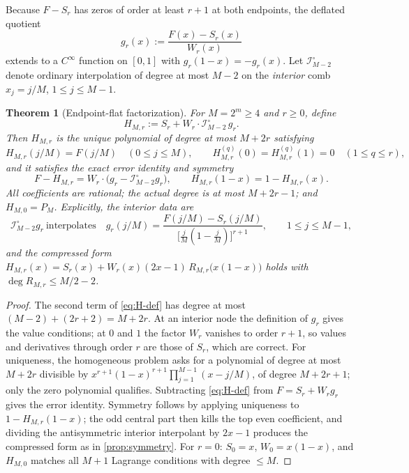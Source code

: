 \documentclass[11pt,oneside]{article}
\numberwithin{equation}{section}
\newtheorem{theorem}{Theorem}[section]
\theoremstyle{definition}
\theoremstyle{remark}
\newcommand{\Lag}{\mathcal I}
\begin{document}
Because $F-S_r$ has zeros of order at least $r+1$ at both endpoints,
the deflated quotient
\begin{equation}
 g_r(x):=\frac{F(x)-S_r(x)}{W_r(x)}
 \label{eq:def-g}
\end{equation}
extends to a $C^\infty$ function on $[0,1]$ with
$g_r(1-x)=-g_r(x)$.  Let $\Lag^{\circ}_{M-2}$ denote ordinary
interpolation of degree at most $M-2$ on the \emph{interior} comb
$x_j=j/M$, $1\le j\le M-1$.

\begin{theorem}[Endpoint-flat factorization]
\label{thm:factorization}
For $M=2^{m}\ge4$ and $r\ge0$, define
\begin{equation}
 H_{M,r}:=S_r+W_r\cdot\Lag^{\circ}_{M-2}\,g_r.
 \label{eq:H-def}
\end{equation}
Then $H_{M,r}$ is the unique polynomial of degree at most $M+2r$
satisfying
\begin{equation}
 H_{M,r}(j/M)=F(j/M)\quad(0\le j\le M),
 \qquad
 H^{(q)}_{M,r}(0)=H^{(q)}_{M,r}(1)=0\quad(1\le q\le r),
 \label{eq:H-conditions}
\end{equation}
and it satisfies the exact error identity and symmetry
\begin{equation}
 F-H_{M,r}=W_r\cdot\bigl(g_r-\Lag^{\circ}_{M-2}g_r\bigr),
 \qquad
 H_{M,r}(1-x)=1-H_{M,r}(x).
 \label{eq:H-error-factor}
\end{equation}
All coefficients are rational; the actual degree is at most
$M+2r-1$; and $H_{M,0}=P_M$.  Explicitly, the interior data are
\begin{equation}
 \Lag^{\circ}_{M-2}g_r\ \text{interpolates}\quad
 g_r(j/M)=\frac{F(j/M)-S_r(j/M)}
 {\bigl[\tfrac jM(1-\tfrac jM)\bigr]^{r+1}},
 \qquad 1\le j\le M-1,
 \label{eq:quotient-data}
\end{equation}
and the compressed form
$H_{M,r}(x)=S_r(x)+W_r(x)(2x-1)\,
R_{M,r}\bigl(x(1-x)\bigr)$ holds with $\deg R_{M,r}\le M/2-2$.
\end{theorem}

\begin{proof}
The second term of \eqref{eq:H-def} has degree at most
$(M-2)+(2r+2)=M+2r$.  At an interior node the definition of
$g_r$ gives the value conditions; at $0$ and $1$ the factor $W_r$
vanishes to order $r+1$, so values and derivatives through order $r$
are those of $S_r$, which are correct.  For uniqueness, the
homogeneous problem asks for a polynomial of degree at most
$M+2r$ divisible by
$x^{r+1}(1-x)^{r+1}\prod_{j=1}^{M-1}(x-j/M)$, of degree
$M+2r+1$; only the zero polynomial qualifies.  Subtracting
\eqref{eq:H-def} from $F=S_r+W_rg_r$ gives the error identity.
Symmetry follows by applying uniqueness to $1-H_{M,r}(1-x)$; the odd
central part then kills the top even coefficient, and dividing the
antisymmetric interior interpolant by $2x-1$ produces the compressed
form as in \cref{prop:symmetry}.  For $r=0$: $S_0=x$,
$W_0=x(1-x)$, and $H_{M,0}$ matches all $M+1$ Lagrange conditions
with degree $\le M$.
\end{proof}
\end{document}
